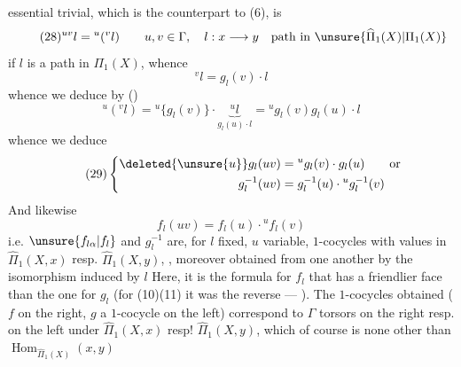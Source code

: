 essential trivial, which is the counterpart to (6), is
\[
\tag{28}{}^{uv}l={}^u({}^vl)
\qquad u,v\in\Gamma,\quad l:x\longrightarrow y\quad\text{path in }\unsure{\widehat\Pi_1(X)|\Pi_1(X)}
\]
 if $l$ is a path in $\Pi_1(X)$, whence
\[
{}^vl=g_l(v)\cdot l
\]
 whence we deduce by ()
\[
{}^u({}^vl)={}^u\{g_l(v)\}\cdot\underbrace{{}^ul}_{g_l(u)\cdot l}
={}^ug_l(v)g_l(u)\cdot l
\]
whence we deduce
\[
\tag{29}\left\{\begin{aligned}
\deleted{\unsure{u}}g_l(uv)&={}^ug_l(v)\cdot g_l(u)\qquad\text{or}\\
g_l^{-1}(uv)&=g_l^{-1}(u)\cdot{}^ug_l^{-1}(v)
\end{aligned}\right.
\]
And likewise
\[
\tag{30}f_l(uv)=f_l(u)\cdot{}^uf_l(v)
\]
i.e. $\unsure{f_{l\alpha}|f_l}$ and $g_l^{-1}$ are, for $l$ fixed, $u$ variable, $1$-cocycles  with values in $\widehat\Pi_1(X,x)$ resp. $\widehat\Pi_1(X,y)$, , moreover obtained from one another by the isomorphism
induced by $l$  Here, it is the formula for $f_l$ that has a friendlier face than the one for $g_l$ (for (10)(11) it was the reverse ---  ). The $1$-cocycles obtained ( $f$  on the right, $g$ a $1$-cocycle on the left) correspond to $\Gamma$ torsors on the right resp. on the left under $\widehat\Pi_1(X,x)$ resp! $\widehat\Pi_1(X,y)$, which of course is none other than $\operatorname{Hom}_{\widehat\Pi_1(X)}(x,y)$

